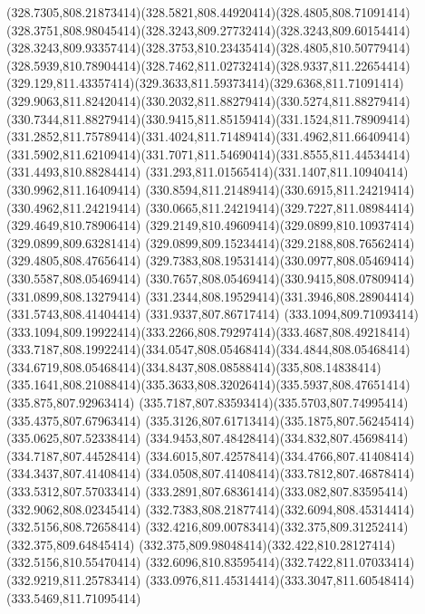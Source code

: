 {{	\curveto(328.7305,808.21873414)(328.5821,808.44920414)(328.4805,808.71091414)
	\curveto(328.3751,808.98045414)(328.3243,809.27732414)(328.3243,809.60154414)
	\curveto(328.3243,809.93357414)(328.3753,810.23435414)(328.4805,810.50779414)
	\curveto(328.5939,810.78904414)(328.7462,811.02732414)(328.9337,811.22654414)
	\curveto(329.129,811.43357414)(329.3633,811.59373414)(329.6368,811.71091414)
	\curveto(329.9063,811.82420414)(330.2032,811.88279414)(330.5274,811.88279414)
	\curveto(330.7344,811.88279414)(330.9415,811.85159414)(331.1524,811.78909414)
	\curveto(331.2852,811.75789414)(331.4024,811.71489414)(331.4962,811.66409414)
	\curveto(331.5902,811.62109414)(331.7071,811.54690414)(331.8555,811.44534414)
	\lineto(331.4493,810.88284414)
	\curveto(331.293,811.01565414)(331.1407,811.10940414)(330.9962,811.16409414)
	\curveto(330.8594,811.21489414)(330.6915,811.24219414)(330.4962,811.24219414)
	\curveto(330.0665,811.24219414)(329.7227,811.08984414)(329.4649,810.78906414)
	\curveto(329.2149,810.49609414)(329.0899,810.10937414)(329.0899,809.63281414)
	\curveto(329.0899,809.15234414)(329.2188,808.76562414)(329.4805,808.47656414)
	\curveto(329.7383,808.19531414)(330.0977,808.05469414)(330.5587,808.05469414)
	\curveto(330.7657,808.05469414)(330.9415,808.07809414)(331.0899,808.13279414)
	\curveto(331.2344,808.19529414)(331.3946,808.28904414)(331.5743,808.41404414)
	\lineto(331.9337,807.86717414)
	\closepath
	\moveto(333.1094,809.71093414)
	\curveto(333.1094,809.19922414)(333.2266,808.79297414)(333.4687,808.49218414)
	\curveto(333.7187,808.19922414)(334.0547,808.05468414)(334.4844,808.05468414)
	\curveto(334.6719,808.05468414)(334.8437,808.08588414)(335,808.14838414)
	\curveto(335.1641,808.21088414)(335.3633,808.32026414)(335.5937,808.47651414)
	\lineto(335.875,807.92963414)
	\curveto(335.7187,807.83593414)(335.5703,807.74995414)(335.4375,807.67963414)
	\curveto(335.3126,807.61713414)(335.1875,807.56245414)(335.0625,807.52338414)
	\curveto(334.9453,807.48428414)(334.832,807.45698414)(334.7187,807.44528414)
	\curveto(334.6015,807.42578414)(334.4766,807.41408414)(334.3437,807.41408414)
	\curveto(334.0508,807.41408414)(333.7812,807.46878414)(333.5312,807.57033414)
	\curveto(333.2891,807.68361414)(333.082,807.83595414)(332.9062,808.02345414)
	\curveto(332.7383,808.21877414)(332.6094,808.45314414)(332.5156,808.72658414)
	\curveto(332.4216,809.00783414)(332.375,809.31252414)(332.375,809.64845414)
	\curveto(332.375,809.98048414)(332.422,810.28127414)(332.5156,810.55470414)
	\curveto(332.6096,810.83595414)(332.7422,811.07033414)(332.9219,811.25783414)
	\curveto(333.0976,811.45314414)(333.3047,811.60548414)(333.5469,811.71095414)
}}
